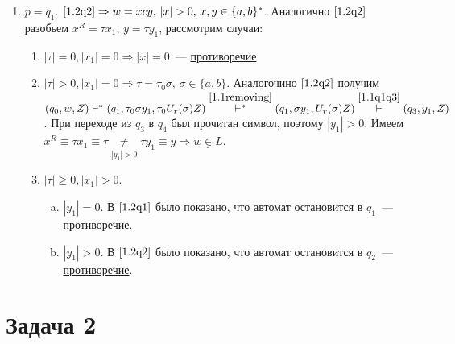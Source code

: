 \documentclass[a4paper]{article}
\begin{document}
\begin{enumerate}[1.]
\begin{enumerate}
\begin{enumerate}
\item $p=q_1$. $\ref{1.2q2}\Rightarrow w=xcy,\,|x|>0,\,x,y\in\{a,b\}^*$. Аналогично $\ref{1.2q2}$ разобьем $x^R=\tau x_1,\,y=\tau y_1$, рассмотрим случаи:\begin{enumerate}
\item $|\tau|=0,|x_1|=0\Rightarrow|x|=0$~--- \underline{противоречие}
\item $|\tau|>0,|x_1|=0\Rightarrow\tau=\tau_0\sigma,\,\sigma\in\{a,b\}$. Аналогочино $\ref{1.2q2}$ получим $(q_0,w,Z)\vdash^*(q_1,\tau_0\sigma y_1,\tau_0 U_r(\sigma)Z)\overset{\ref{1.1removing}}{\vdash^*}(q_1,\sigma y_1,U_r(\sigma)Z)\overset{\ref{1.1q1q3}}{\vdash}(q_3,y_1,Z)$. При переходе из $q_3$ в $q_4$ был прочитан символ, поэтому $|y_1|>0$. Имеем $x^R\equiv\tau x_1\equiv\tau\underset{|y_1|>0}{\neq}\tau y_1\equiv y\Rightarrow\underline{w\in L}$.
\item $|\tau|\geqslant 0,|x_1|>0$.\begin{enumerate}[a.]
\item $|y_1|=0$. В $\ref{1.2q1}$ было показано, что автомат остановится в $q_1$~--- \underline{противоречие}.
\item $|y_1|>0$. В $\ref{1.2q2}$ было показано, что автомат остановится в $q_2$~--- \underline{противоречие}.
\end{enumerate}
\end{enumerate}
\end{enumerate}
\end{enumerate}
\end{enumerate}
\section*{Задача 2}
\end{document}
